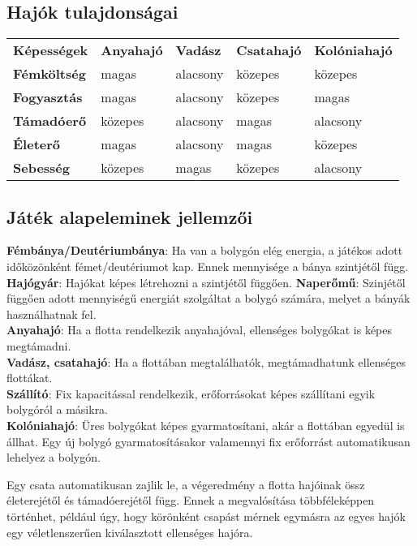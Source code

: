 \documentclass[12pt,a4paper]{article}
\begin{document}
\subsection{Hajók tulajdonságai}
\begin{tabular}{lllll}
\textbf{Képességek} & \textbf{Anyahajó} & \textbf{Vadász} & \textbf{Csatahajó} & \textbf{Kolóniahajó} \\
\textbf{Fémköltség} & magas & alacsony & közepes & közepes \\
\textbf{Fogyasztás} & magas & alacsony & közepes & magas \\
\textbf{Támadóerő} & közepes & alacsony & magas & alacsony \\
\textbf{Életerő} & magas & alacsony & magas & közepes \\
\textbf{Sebesség} & közepes & magas & közepes & alacsony

\end{tabular}

\subsection{Játék alapeleminek jellemzői}

\textbf{Fémbánya/Deutériumbánya}:  Ha van a bolygón elég energia, a játékos adott időközönként fémet/deutériumot kap. Ennek mennyisége a bánya szintjétől függ. \\

\textbf{Hajógyár}: Hajókat képes létrehozni a szintjétől függően.
\textbf{Naperőmű}: Szinjétől függően adott mennyiségű energiát szolgáltat a bolygó számára, melyet a bányák használhatnak fel. \\

\textbf{Anyahajó}: Ha a flotta rendelkezik anyahajóval, ellenséges bolygókat is képes megtámadni. \\

\textbf{Vadász, csatahajó}: Ha a flottában megtalálhatók, megtámadhatunk ellenséges flottákat. \\

\textbf{Szállító}: Fix kapacitással rendelkezik, erőforrásokat képes szállítani egyik bolygóról a másikra. \\

\textbf{Kolóniahajó}: Üres bolygókat képes gyarmatosítani, akár a flottában egyedül is állhat. Egy új bolygó gyarmatosításakor valamennyi fix erőforrást automatikusan lehelyez a bolygón.

Egy csata automatikusan zajlik le, a végeredmény a flotta hajóinak össz életerejétől és támadóerejétől függ. Ennek a megvalósítása többféleképpen történhet, például úgy, hogy körönként csapást mérnek egymásra az egyes hajók egy véletlenszerűen kiválasztott ellenséges hajóra.
\end{document}
